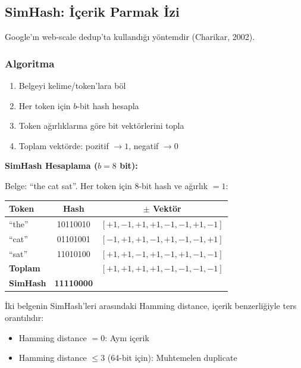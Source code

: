 \subsection{SimHash: \.{I}\c{c}erik Parmak \.{I}zi}
\label{subsec:simhash}

Google'{\i}n web-scale dedup'ta kulland{\i}\u{g}{\i} y\"{o}ntemdir (Charikar, 2002).

\subsubsection{Algoritma}

\begin{enumerate}
  \item Belgeyi kelime/token'lara b\"{o}l
  \item Her token i\c{c}in $b$-bit hash hesapla
  \item Token a\u{g}{\i}rl{\i}klar{\i}na g\"{o}re bit vekt\"{o}rlerini topla
  \item Toplam vekt\"{o}rde: pozitif $\to 1$, negatif $\to 0$
\end{enumerate}

\begin{ornek}
\textbf{SimHash Hesaplama ($b = 8$ bit):}

Belge: ``the cat sat''. Her token i\c{c}in 8-bit hash ve a\u{g}{\i}rl{\i}k $= 1$:

\begin{center}
\begin{tabular}{lcc}
\toprule
\color{chapterBlue}\textbf{Token} & \color{chapterBlue}\textbf{Hash} & \color{chapterBlue}\textbf{$\pm$ Vekt\"{o}r} \\
\midrule
``the'' & 10110010 & $[+1, -1, +1, +1, -1, -1, +1, -1]$ \\
``cat'' & 01101001 & $[-1, +1, +1, -1, +1, -1, -1, +1]$ \\
``sat'' & 11010100 & $[+1, +1, -1, +1, -1, +1, -1, -1]$ \\
\midrule
\textbf{Toplam} & & $[+1, +1, +1, +1, -1, -1, -1, -1]$ \\
\textbf{SimHash} & \textbf{11110000} & \\
\bottomrule
\end{tabular}
\end{center}

\.{I}ki belgenin SimHash'leri aras{\i}ndaki Hamming distance, i\c{c}erik benzerli\u{g}iyle ters orant{\i}l{\i}d{\i}r:
\begin{itemize}
  \item Hamming distance $= 0$: Ayn{\i} i\c{c}erik
  \item Hamming distance $\leq 3$ (64-bit i\c{c}in): Muhtemelen duplicate
\end{itemize}
\end{ornek}

